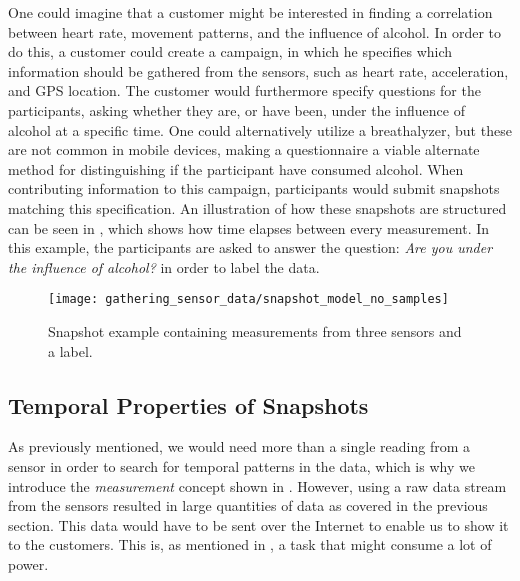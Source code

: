 One could imagine that a customer might be interested in finding a correlation between heart rate, movement patterns, and the influence of alcohol. In order to do this, a customer could create a campaign, in which he specifies which information should be gathered from the sensors, such as heart rate, acceleration, and GPS location. The customer would furthermore specify questions for the participants, asking whether they are, or have been, under the influence of alcohol at a specific time. One could alternatively utilize a breathalyzer, but these are not common in mobile devices, making a questionnaire a viable alternate method for distinguishing if the participant have consumed alcohol. When contributing information to this campaign, participants would submit snapshots matching this specification. An illustration of how these snapshots are structured can be seen in , which shows how time elapses between every measurement. In this example, the participants are asked to answer the question: \emph{Are you under the influence of alcohol?} in order to label the data.
\\
\begin{figure}[!htbp]
    \centering
    \texttt{[image: gathering\_sensor\_data/snapshot\_model\_no\_samples]}
    \caption{Snapshot example containing measurements from three sensors and a label.}
    \label{fig:snapshot_model_no_samples}
\end{figure}
\FloatBarrier



\subsection{Temporal Properties of Snapshots}
\label{sec:temporal_properties_of_snapshots}


As previously mentioned, we would need more than a single reading from a sensor in order to search for temporal patterns in the data, which is why we introduce the \emph{measurement} concept shown in . However, using a raw data stream from the sensors resulted in large quantities of data as covered in the previous section. This data would have to be sent over the Internet to enable us to show it to the customers. This is, as mentioned in , a task that might consume a lot of power. 

